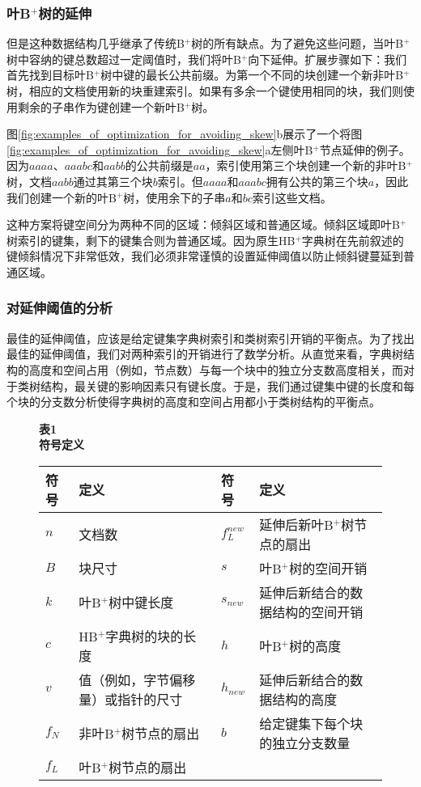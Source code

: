\subsubsection{叶B$^+$树的延伸}

但是这种数据结构几乎继承了传统B$^+$树的所有缺点。为了避免这些问题，当叶B$^+$树中容纳的键总数超过一定阈值时，我们将叶B$^+$向下延伸。扩展步骤如下：我们首先找到目标叶B$^+$树中键的最长公共前缀。为第一个不同的块创建一个新非叶B$^+$树，相应的文档使用新的块重建索引。如果有多余一个键使用相同的块，我们则使用剩余的子串作为键创建一个新叶B$^+$树。

图\ref{fig:examples_of_optimization_for_avoiding_skew}b展示了一个将图\ref{fig:examples_of_optimization_for_avoiding_skew}a左侧叶B$^+$节点延伸的例子。因为$aaaa$、$aaabc$和$aabb$的公共前缀是$aa$，索引使用第三个块创建一个新的非叶B$^+$树，文档$aabb$通过其第三个块$b$索引。但$aaaa$和$aaabc$拥有公共的第三个块$a$，因此我们创建一个新的叶B$^+$树，使用余下的子串$a$和$bc$索引这些文档。

这种方案将键空间分为两种不同的区域：倾斜区域和普通区域。倾斜区域即叶B$^+$树索引的键集，剩下的键集合则为普通区域。因为原生HB$^+$字典树在先前叙述的键倾斜情况下非常低效，我们必须非常谨慎的设置延伸阈值以防止倾斜键蔓延到普通区域。

\subsubsection{对延伸阈值的分析}

最佳的延伸阈值，应该是给定键集字典树索引和类树索引开销的平衡点。为了找出最佳的延伸阈值，我们对两种索引的开销进行了数学分析。从直觉来看，字典树结构的高度和空间占用（例如，节点数）与每一个块中的独立分支数高度相关，而对于类树结构，最关键的影响因素只有键长度。于是，我们通过键集中键的长度和每个块的分支数分析使得字典树的高度和空间占用都小于类树结构的平衡点。

\begin{figure}[htbp]
    \centering
    {
    \bfseries
    表1 \\
    符号定义 \\[1.5em]
    }
    \begin{tabular}{|p{3em}p{14em}|p{3em}p{14em}|}
    \hline
    符号 & 定义 & 符号 & 定义 \\
    \hline
    $n$ & 文档数 & $f_L^{new}$ & 延伸后新叶B$^+$树节点的扇出 \\
    $B$ & 块尺寸 & $s$ & 叶B$^+$树的空间开销 \\
    $k$ & 叶B$^+$树中键长度 & $s_{new}$ & 延伸后新结合的数据结构的空间开销 \\
    $c$ & HB$^+$字典树的块的长度 & $h$ & 叶B$^+$树的高度 \\
    $v$ & 值（例如，字节偏移量）或指针的尺寸 & $h_{new}$ & 延伸后新结合的数据结构的高度 \\
    $f_N$ & 非叶B$^+$树节点的扇出 & $b$ & 给定键集下每个块的独立分支数量 \\
    $f_L$ & 叶B$^+$树节点的扇出 & & \\
    \hline
    \end{tabular}
\end{figure}

